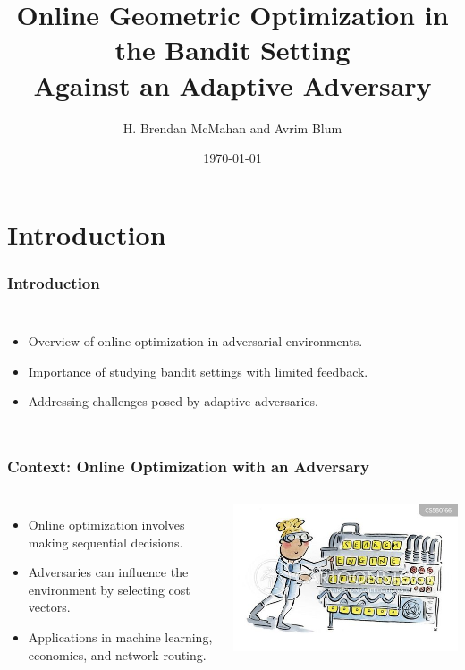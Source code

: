 \documentclass{beamer}
\title{Online Geometric Optimization in the Bandit Setting\\Against an Adaptive Adversary}
\author{H. Brendan McMahan and Avrim Blum}
\institute{Carnegie Mellon University}
\date{\today}
\begin{document}
\maketitle

\section{Introduction}

\begin{frame}
\frametitle{Introduction}
\begin{columns}
    \begin{itemize}
        \item Overview of online optimization in adversarial environments.
        \item Importance of studying bandit settings with limited feedback.
        \item Addressing challenges posed by adaptive adversaries.
    \end{itemize}
\end{columns}
\end{frame}

\begin{frame}
\frametitle{Context: Online Optimization with an Adversary}
\begin{columns}
    \begin{itemize}
        \item Online optimization involves making sequential decisions.
        \item Adversaries can influence the environment by selecting cost vectors.
        \item Applications in machine learning, economics, and network routing.
    \end{itemize}
    \includegraphics[width=\textwidth]{images/adversary_context.jpg} %
\end{columns}
\end{frame}
\end{document}
